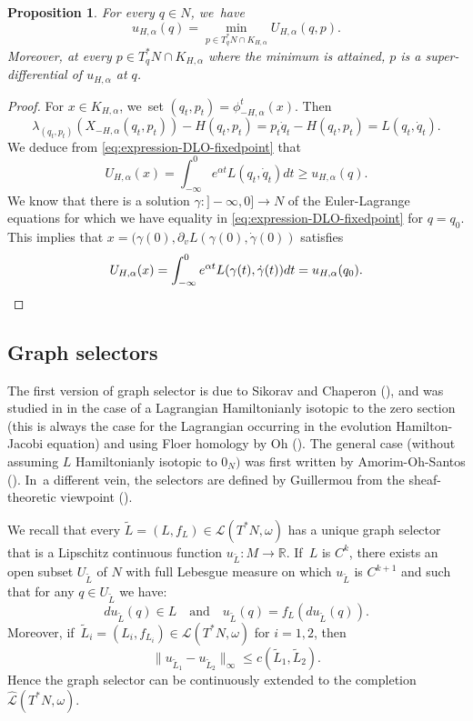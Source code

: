 \documentclass[JEP,XML,SOM,Unicode,NoFloatCountersInSection,published]{cedram}
\newtheorem{prop}[thm]{Proposition}
\theoremstyle{definition}
\newcommand {\LL}{{\mathcal L}}
\newcommand{\R}{\mathbb{R}}
\newcommand{\hatLL}{\widehat{\LL}}
\begin{document}
\begin{prop}\label{prop:u-and-U}
For every $q\in N$, we~have
\[
u_{H, \alpha}(q)=\min_{p\in T_q^*N\cap K_{H, \alpha}}U_{H, \alpha}(q,p).
\]
Moreover, at every $p\in T_q^*N\cap K_{H, \alpha}$ where the minimum is attained, $p$ is a super-differential of $u_{H, \alpha}$ at $q$.
\end{prop}
\begin{proof} For $x\in K_{H, \alpha}$, we~set $(q_t, p_t)=\phi_{-H, \alpha}^t(x)$. Then
\[
\lambda_{(q_t, p_t)}(X_{-H, \alpha}(q_t, p_t))-H(q_t, p_t)=p_t\dot q_t-H(q_t, p_t)=L(q_t, \dot q_t).
\]
We deduce from \eqref{eq:expression-DLO-fixedpoint} that
\[
U_{H, \alpha}(x)=\int_{-\infty}^0 e^{\alpha t}L(q_t, \dot q_t)dt\geq u_{H, \alpha}(q).
\]
We know that there is a solution $\gamma:{}]-\infty, 0]\to N$ of the Euler-Lagrange equations for which we have equality in \eqref{eq:expression-DLO-fixedpoint} for $q=q_0$. This implies that $x=(\gamma(0), \partial_vL(\gamma(0), \dot \gamma(0))$ satisfies
\[
U_{H, \alpha}(x)=\int_{-\infty}^0e^{\alpha t}L(\gamma(t), \dot\gamma (t))dt=u_{H, \alpha}(q_0).\qedhere
\]
\end{proof}

\subsection{Graph selectors}\label{sec:graph-selectors}The first version of graph selector is due to Sikorav and Chaperon (\cite{Sik,Chaperon-HJ}), and was studied in
\cite{Viterbo-Ottolenghi,Viterbo-Ott} in the case of a Lagrangian Hamiltonianly isotopic to the zero section (this is always the case for the Lagrangian occurring in the evolution Hamilton-Jacobi equation) and using Floer homology by Oh (\cite{Oh-action-functional-I}). The general case (without assuming $L$ Hamiltonianly isotopic to $0_N)$ was first written by Amorim-Oh-Santos (\cite{Amorim-Oh-Santos}). In~a different vein, the selectors are defined by Guillermou from the sheaf-theoretic viewpoint (\cite{Vichery-these,Guillermou-Asterisque}).

We recall that every $\tilde L=(L, f_L)\in\LL(T^*N,\omega)$ has a unique graph selector that is a Lipschitz continuous function $u_{\tilde L}:M\to \R$. If~$L$ is $C^k$, there exists an open subset $U_{\tilde L}$ of $N$ with full Lebesgue measure on which $u_{\tilde L}$ is $C^{k+1}$ and such that for any $q\in U_{\tilde L}$ we have:
\[
du_{\tilde L}(q)\in L\quad\text{and}\quad u_{\tilde L}(q)=f_L(du_{\tilde L}(q)).
\]
Moreover, if~$\tilde L_i=(L_i, f_{L_i})\in\LL(T^*N,\omega)$ for $i=1, 2$, then
\[
\| u_{\tilde L_1}-u_{\tilde L_2}\|_\infty\leq c(\tilde L_1, \tilde L_2).
\]
Hence the graph selector can be continuously extended to the completion $\hatLL(T^*N,\omega)$.
\end{document}
